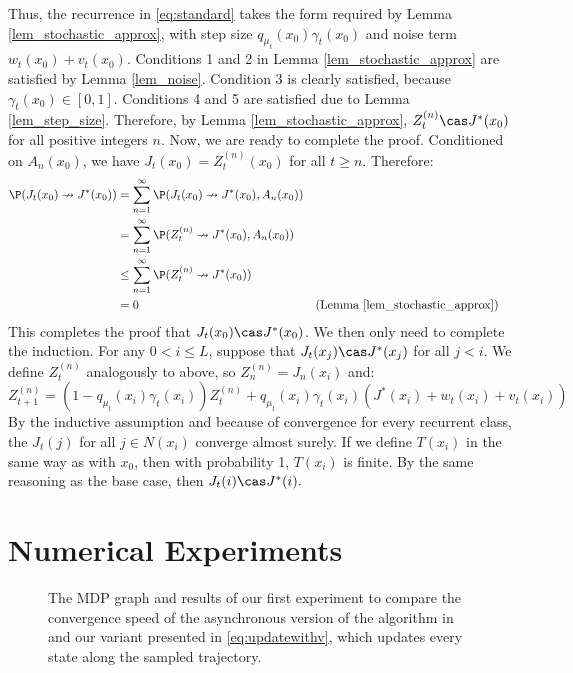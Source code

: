 \documentclass[12pt]{article}
\begin{document}
Thus, the recurrence in \eqref{eq:standard} takes the form required by Lemma \ref{lem_stochastic_approx}, with step size $q_{\mu_t}(x_0)\gamma_t(x_0)$ and noise term $w_t(x_0) + v_t(x_0)$. Conditions 1 and 2 in Lemma \ref{lem_stochastic_approx} are satisfied by Lemma \ref{lem_noise}. Condition 3 is clearly satisfied, because $\gamma_t(x_0) \in [0, 1]$. Conditions 4 and 5 are satisfied due to Lemma \ref{lem_step_size}. Therefore, by Lemma \ref{lem_stochastic_approx}, $Z_t^{(n)} \cas J^*(x_0)$ for all positive integers $n$. Now, we are ready to complete the proof. Conditioned on $A_n(x_0)$, we have $J_t(x_0) = Z_t^{(n)}(x_0)$ for all $t \geq n$. Therefore:
\begin{align*}
    \P(J_t(x_0) \nrightarrow J^*(x_0)) &= \sum_{n=1}^\infty \P(J_t(x_0) \nrightarrow J^*(x_0), A_n(x_0))\\
    &= \sum_{n=1}^\infty \P(Z_t^{(n)} \nrightarrow J^*(x_0), A_n(x_0))\\
    &\leq \sum_{n=1}^\infty \P(Z_t^{(n)} \nrightarrow J^*(x_0))\\
    &= 0 && \text{(Lemma \ref{lem_stochastic_approx})}
\end{align*}
This completes the proof that $J_t(x_0) \cas J^*(x_0)$. We then only need to complete the induction. For any $0 < i \leq L$, suppose that $J_t(x_j) \cas J^*(x_j)$ for all $j < i$. We define $Z_t^{(n)}$ analogously to above, so $Z_n^{(n)} = J_n(x_i)$ and:
\begin{equation*}
Z_{t+1}^{(n)} = (1-q_{\mu_t}(x_i)\gamma_t(x_i))Z_t^{(n)} + q_{\mu_t}(x_i)\gamma_t(x_i)(J^*(x_i) +  w_t(x_i) + v_t(x_i))
\end{equation*}
By the inductive assumption and because of convergence for every recurrent class, the $J_t(j)$ for all $j \in N(x_i)$ converge almost surely. If we define $T(x_i)$ in the same way as with $x_0$, then with probability 1, $T(x_i)$ is finite. By the same reasoning as the base case, then $J_t(i) \cas J^*(i).$




\section{Numerical Experiments}
\begin{figure}[ht]
    \centering
   \label{fig:sim1}
   \caption{The MDP graph and results of our first experiment to compare the convergence speed of the asynchronous version of the algorithm in \cite{tsitsiklis2002convergence} and our variant presented in \ref{eq:updatewithv}, which updates every state along the sampled trajectory.}
\end{figure}
\end{document}
